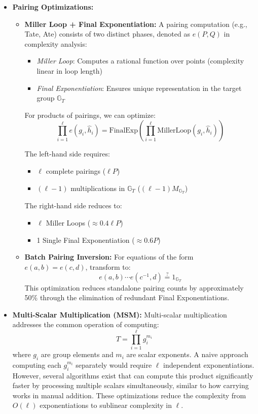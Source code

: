 {\begin{itemize}
    \item \textbf{Pairing Optimizations:}
    \begin{itemize}
        \item \textbf{Miller Loop + Final Exponentiation:} 
        A pairing computation (e.g., Tate, Ate) consists of two distinct phases, denoted as $e(P,Q)$ in complexity analysis:
        \begin{itemize}
            \item \textit{Miller Loop}: Computes a rational function over points (complexity linear in loop length)
            \item \textit{Final Exponentiation}: Ensures unique representation in the target group $\mathbb{G}_T$
        \end{itemize}
        
        For products of pairings, we can optimize:
        \[
        \prod_{i=1}^\ell e(g_i, \hat{h}_i) = \text{FinalExp}\left(\prod_{i=1}^\ell \text{MillerLoop}(g_i, \hat{h}_i)\right)
        \]
        
        \noindent The left-hand side requires:
        \begin{itemize}
            \item $\ell$ complete pairings ($\ell P$)
            \item $(\ell-1)$ multiplications in $\mathbb{G}_T$ ($(\ell-1)M_{\mathbb{G}_T}$)
        \end{itemize}
        
        \noindent The right-hand side reduces to:
        \begin{itemize}
            \item $\ell$ Miller Loops ($\approx 0.4\ell P$)
            \item 1 Single Final Exponentiation ($\approx 0.6P$)
        \end{itemize}
        
        \item \textbf{Batch Pairing Inversion:} For equations of the form $e(a,b) = e(c,d)$, transform to:
        \[
        e(a,b) \cdots e(c^{-1},d) \stackrel{?}{=} 1_{\mathbb{G}_T}
        \]
        This optimization reduces standalone pairing counts by approximately 50\% through the elimination of redundant Final Exponentiations.
    \end{itemize}
    
    \item \textbf{Multi-Scalar Multiplication (MSM):}
        Multi-scalar multiplication addresses the common operation of computing:
        \[
            T = \prod_{i=1}^\ell g_i^{m_i}
        \]
        where $g_i$ are group elements and $m_i$ are scalar exponents. A naive approach computing each $g_i^{m_i}$ separately would require $\ell$ independent exponentiations. However, several algorithms exist that can compute this product significantly faster by processing multiple scalars simultaneously, similar to how carrying works in manual addition. These optimizations reduce the complexity from $O(\ell)$ exponentiations to sublinear complexity in $\ell$.
        

\end{itemize}}
